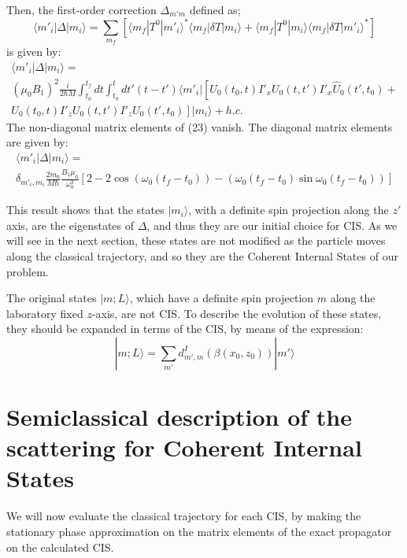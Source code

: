 \documentclass[aps,preprint,prl]{revtex4-2}
\newcommand{\be}{\begin{equation}}
\newcommand{\ee}{\end{equation}}
\begin{document}
Then, the first-order correction $\Delta_{m'm}$ defined as;
\be
\langle m'_i|\Delta|m_i \rangle = \sum_{m_f}[ \langle m_f|T^0|m'_i \rangle ^* \langle m_f|\delta T|m_i \rangle + 
 \langle m_f|T^0|m_i \rangle \langle m_f|\delta T|m'_i \rangle^* ]  
\ee
is given by:
\begin{multline}
\langle m'_i|\Delta|m_i \rangle  = \\
\left( \mu_0 B_1 \right)^2 \frac{i}{2 \hbar M} \int^{t_f}_{t_0} dt
 \int^{t}_{t_0}dt' (t-t')    
  \langle m'_i | \left[U_0(t_0,t){I'}_x U_0(t,t')
{I'}_x \hat{U}_0(t',t_0) +   \right. \\
   \left. U_0(t_0,t) {I'}_z U_0(t,t')
 {I'}_z U_0(t',t_0) \right] |m_i \rangle + h.c.
\label{del}
\end{multline}
The non-diagonal matrix elements of (23) vanish. 
The diagonal matrix elements are given by: 
\begin{multline}
\langle m'_i|\Delta|m_i \rangle =  \\ \delta_{m'_i, m_i}
 \frac{2 m_0}{M \hbar} \frac{B_1 \mu_0}{\omega_0^3}
\left[ 2 - 2 \cos(\omega_0 (t_f-t_0)) -
(\omega_0 (t_f - t_0) \sin  \omega_0 (t_f -t_0)) \right] 
\end{multline}
 
This result shows that the states $|m_i \rangle$, with a definite spin projection 
along the $z'$ axis, are the eigenstates of $\Delta$, and thus they are  
our initial choice for  CIS.  As we will see in the next section, these
states are not modified as the particle moves along the classical trajectory,
and so they are the Coherent Internal States of our problem.

The original states $|m;L \rangle$, which have a definite spin 
projection $m$ along the laboratory fixed $z$-axis, are not 
CIS. To describe the evolution of these states, they should be expanded in 
terms of the CIS, by means of the expression: 
\be
|m;L \rangle = \sum_{m'}d^I_{m',m}( \beta(x_0,z_0))|m'\rangle
\ee


\section{Semiclassical description of the scattering for Coherent Internal
States}

We will now evaluate the classical trajectory 
for each CIS, by making the stationary phase approximation on the 
matrix elements of the exact propagator on the calculated CIS.
\end{document}
